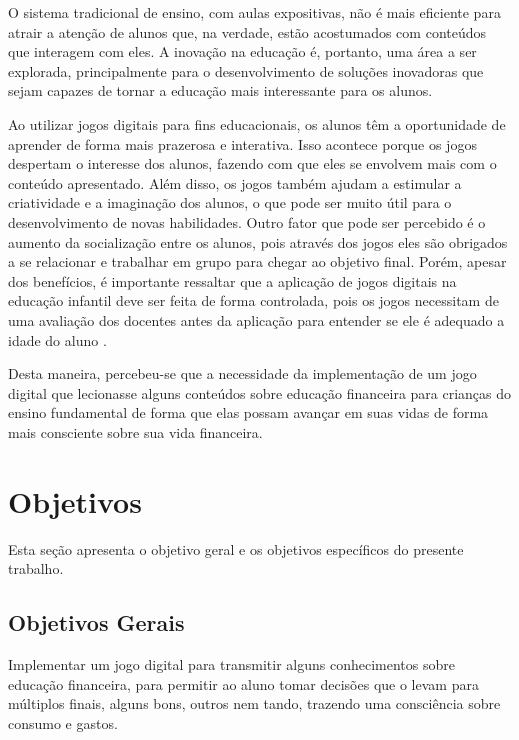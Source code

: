         O sistema tradicional de ensino, com aulas expositivas, não é mais eficiente para atrair a atenção de alunos
        que, na verdade, estão acostumados com conteúdos que interagem com eles. A inovação na educação é, portanto, uma
        área a ser explorada, principalmente para o desenvolvimento de soluções inovadoras que sejam capazes de tornar a
        educação mais interessante para os alunos.

        Ao utilizar jogos digitais para fins educacionais, os alunos têm a oportunidade de aprender de forma mais
        prazerosa e interativa. Isso acontece porque os jogos despertam o interesse dos alunos, fazendo com que eles se
        envolvem mais com o conteúdo apresentado. Além disso, os jogos também ajudam a estimular a criatividade e a
        imaginação dos alunos, o que pode ser muito útil para o desenvolvimento de novas habilidades.  Outro fator que
        pode ser percebido é o aumento da socialização entre os alunos, pois através dos jogos eles são obrigados a se
        relacionar e trabalhar em grupo para chegar ao objetivo final. Porém, apesar dos benefícios, é importante
        ressaltar que a aplicação de jogos digitais na educação infantil deve ser feita de forma controlada, pois os
        jogos necessitam de uma avaliação dos docentes antes da aplicação para entender se ele é adequado a idade do
        aluno \cite{Cruz_Araujo_Andrye_Galvao_Madeira_2022}.

        Desta maneira, percebeu-se que a necessidade da implementação de um jogo digital que lecionasse alguns
        conteúdos sobre educação financeira para crianças do ensino fundamental de forma que elas possam avançar em suas
        vidas de forma mais consciente sobre sua vida financeira.

    \section{Objetivos}

        Esta seção apresenta o objetivo geral e os objetivos específicos do presente trabalho.

        \subsection{Objetivos Gerais}

            Implementar um jogo digital para transmitir alguns conhecimentos sobre educação financeira, para permitir ao
            aluno tomar decisões que o levam para múltiplos finais, alguns bons, outros nem tando, trazendo uma
            consciência sobre consumo e gastos.

